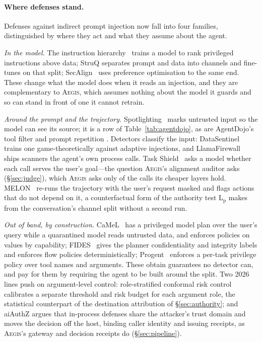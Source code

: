 \documentclass[sigconf,nonacm]{acmart}
\newcommand{\system}{\textsc{Aegis}\xspace}
\begin{document}
\paragraph{Where defenses stand.} Defenses against indirect prompt
injection now fall into four families, distinguished by where they act
and what they assume about the agent.

\emph{In the model.} The instruction hierarchy~\cite{wallace2024hierarchy}
trains a model to rank privileged instructions above data; StruQ
\cite{chen2025struq} separates prompt and data into channels and
fine-tunes on that split; SecAlign~\cite{chen2025secalign} uses
preference optimisation to the same end. These change what the model
does when it reads an injection, and they are complementary to \system,
which assumes nothing about the model it guards and so can stand in front
of one it cannot retrain.

\emph{Around the prompt and the trajectory.}
Spotlighting~\cite{hines2024spotlighting} marks untrusted input so the
model can see its source; it is a row of Table~\ref{tab:agentdojo}, as
are AgentDojo's tool filter and prompt repetition
\cite{debenedetti2024agentsec}. Detectors classify the input:
DataSentinel~\cite{liu2025datasentinel} trains one game-theoretically
against adaptive injections, and LlamaFirewall
\cite{chennabasappa2025llamafirewall} ships scanners the agent's own
process calls. Task Shield~\cite{jia2024taskshield} asks a model whether
each call serves the user's goal---the question \system's alignment
auditor asks (\S\ref{sec:judge}), which \system asks only of the calls its
cheaper layers hold. MELON~\cite{zhu2025melon} re-runs the trajectory
with the user's request masked and flags actions that do not depend on
it, a counterfactual form of the authority test L$_\mathrm{p}$ makes
from the conversation's channel split without a second run.

\emph{Out of band, by construction.} CaMeL~\cite{debenedetti2025camel}
has a privileged model plan over the user's query while a quarantined
model reads untrusted data, and enforces policies on values by
capability; FIDES~\cite{costa2025fides} gives the planner confidentiality
and integrity labels and enforces flow policies deterministically;
Progent~\cite{shi2025progent} enforces a per-task privilege policy over
tool names and arguments. These obtain guarantees no detector can, and
pay for them by requiring the agent to be built around the split. Two
2026 lines push on argument-level control: role-stratified conformal risk
control~\cite{rahman2026rolestratified} calibrates a separate threshold
and risk budget for each argument role, the statistical counterpart of
the destination attribution of \S\ref{sec:authority}; and aiAuthZ
\cite{kodathala2026aiauthz} argues that in-process defenses share the
attacker's trust domain and moves the decision off the host, binding
caller identity and issuing receipts, as \system's gateway and decision
receipts do (\S\ref{sec:pipeline}).
\end{document}
